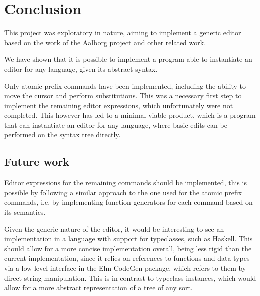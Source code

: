 \section{Conclusion}
This project was exploratory in nature, aiming to implement a generic editor
based on the work of the Aalborg project\cite{aalborg} and other related work.

We have shown that it is possible to implement a program able to instantiate
an editor for any language, given its abstract syntax.

Only atomic prefix commands have been implemented, including the ability to
move the cursor and perform substitutions. This was a necessary first step
to implement the remaining editor expressions, which unfortunately were not
completed. This however has led to a minimal viable product, which is a
program that can instantiate an editor for any language, where basic
edits can be performed on the syntax tree directly.

\subsection{Future work}
Editor expressions for the remaining commands should be implemented, this is possible by following a similar approach to the one used for the atomic prefix commands, i.e. by implementing function generators for each command based on its semantics.

Given the generic nature of the editor, it would be interesting to see
an implementation in a language with support for typeclasses, such as Haskell.
This should allow for a more concise implementation overall, being less rigid
than the current implementation, since it relies on references to functions and
data types via a low-level interface in the Elm CodeGen package, which refers
to them by direct string manipulation. This is in contrast to typeclass
instances, which would allow for a more abstract representation of a tree
of any sort.


